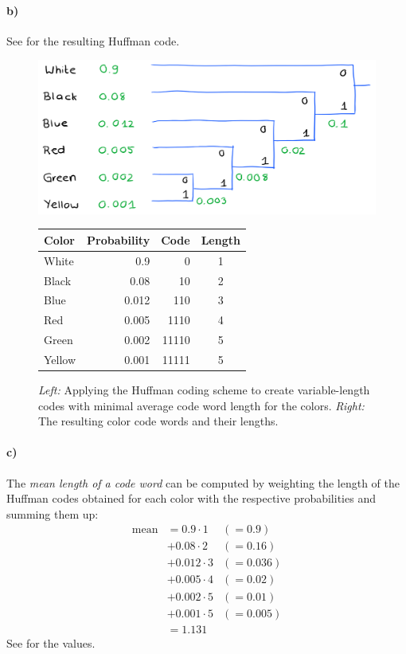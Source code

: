 \documentclass[a4paper,twocolumn]{article}
\begin{document}
	\paragraph{b)} %
	See  for the resulting Huffman code.
	\begin{figure}[t]
		\begin{minipage}{0.5\textwidth}
			\includegraphics[width=\linewidth]{figures/huffman_code.png}
		\end{minipage}
		\hfill
		\begin{minipage}{0.4\textwidth}
			\begin{tabular}{l r r c}
				\textbf{Color} & \textbf{Probability} & \textbf{Code} & \textbf{Length}\\
				\hline
				White & 0.9 & 0 & 1 \\
				Black & 0.08 & 10 & 2 \\
				Blue & 0.012 & 110 & 3 \\
				Red & 0.005 & 1110 & 4 \\
				Green & 0.002 & 11110 & 5 \\
				Yellow & 0.001 & 11111 & 5
			\end{tabular}
		\end{minipage}
		\caption{\textit{Left:} Applying the Huffman coding scheme to create variable-length codes with minimal average code word length for the colors. \textit{Right:} The resulting color code words and their lengths.}
		\label{fig:huffman_code}
	\end{figure}
	
	\paragraph{c)} %
	The \textit{mean length of a code word} can be computed by weighting the length of the Huffman codes obtained for each color with the respective probabilities and summing them up:
	\begin{align*}
	\text{mean} 
	&= 0.9 \cdot 1 	 &(=0.9) \\
	&+ 0.08 \cdot 2  &(=0.16) \\
	&+ 0.012 \cdot 3 &(=0.036) \\ 
	&+ 0.005 \cdot 4 &(=0.02) \\ 
	&+ 0.002 \cdot 5 &(=0.01) \\ 
	&+ 0.001 \cdot 5 &(=0.005) \\ 
	&= 1.131
	\end{align*}
	See  for the values.
	
\end{document}
